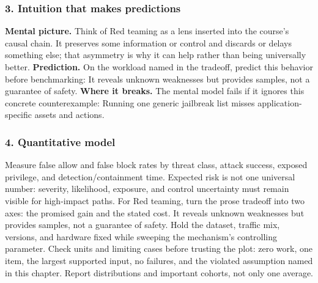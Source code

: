 \subsubsection*{3. Intuition that makes predictions}
\textbf{Mental picture.} Think of Red teaming as a lens inserted into the course's causal chain. It preserves some information or control and discards or delays something else; that asymmetry is why it can help rather than being universally better.
\textbf{Prediction.} On the workload named in the tradeoff, predict this behavior before benchmarking: It reveals unknown weaknesses but provides samples, not a guarantee of safety.
\textbf{Where it breaks.} The mental model fails if it ignores this concrete counterexample: Running one generic jailbreak list misses application-specific assets and actions.
\subsubsection*{4. Quantitative model}
Measure false allow and false block rates by threat class, attack success, exposed privilege, and detection/containment time. Expected risk is not one universal number: severity, likelihood, exposure, and control uncertainty must remain visible for high-impact paths.
For Red teaming, turn the prose tradeoff into two axes: the promised gain and the stated cost. It reveals unknown weaknesses but provides samples, not a guarantee of safety. Hold the dataset, traffic mix, versions, and hardware fixed while sweeping the mechanism's controlling parameter.
Check units and limiting cases before trusting the plot: zero work, one item, the largest supported input, no failures, and the violated assumption named in this chapter. Report distributions and important cohorts, not only one average.
